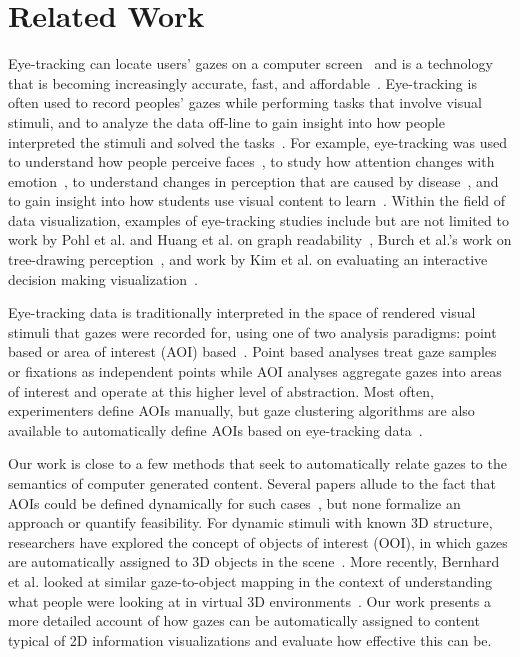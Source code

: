 \section{Related Work}
Eye-tracking can locate users' gazes on a computer screen~\cite{ware1987evaluation, jacob1991use} and is a technology that is becoming increasingly accurate, fast, and affordable~\cite{duchowski2007eye, sesma2012evaluation}. Eye-tracking is often used to record peoples' gazes while performing tasks that involve visual stimuli, and to analyze the data off-line to gain insight into how people interpreted the stimuli and solved the tasks~\cite{duchowski2007eye}. For example, eye-tracking was used to understand how people perceive faces~\cite{guo2014perceiving,shasteen2014eye}, to study how attention changes with emotion~\cite{vervoort2013attentional}, to understand changes in perception that are caused by disease~\cite{kim2014investigating}, and to gain insight into how students use visual content to learn~\cite{zawoyski2014using,mayer2010unique,van2010eye,conati2013eye}. Within the field of data visualization, examples of eye-tracking studies include but are not limited to work by Pohl et al. and Huang et al. on graph readability~\cite{pohl2009comparing,huang2008beyond,huang2005people}, Burch et al.'s work on tree-drawing perception~\cite{burch2011evaluation,burch2013visual}, and work by Kim et al. on evaluating an interactive decision making visualization~\cite{kim2012does}.
 
Eye-tracking data is traditionally interpreted in the space of rendered visual stimuli that gazes were recorded for, using one of two analysis paradigms: point based or area of interest (AOI) based~\cite{blascheckstate}. Point based analyses treat gaze samples or fixations as independent points while AOI analyses aggregate gazes into areas of interest and operate at this higher level of abstraction. Most often, experimenters define AOIs manually, but gaze clustering algorithms are also available to automatically define AOIs based on eye-tracking data~\cite{privitera2000algorithms,santella2004robust,drusch2014analysing}. 

Our work is close to a few methods that seek to automatically relate gazes to the semantics of computer generated content. Several papers allude to the fact that AOIs could be defined dynamically for such cases~\cite{steichen2013user,kurzhals2014iseecube}, but none formalize an  approach or quantify feasibility. For dynamic stimuli with known 3D structure, researchers have explored the concept of objects of interest (OOI), in which gazes are automatically assigned to 3D objects in the scene~\cite{stellmach20103d}. More recently, Bernhard et al. looked at similar gaze-to-object mapping in the context of understanding what people were looking at in virtual 3D environments~\cite{bernhard2014gaze}. Our work presents a more detailed account of how gazes can be automatically assigned to content typical of 2D information visualizations and evaluate how effective this can be.
 
